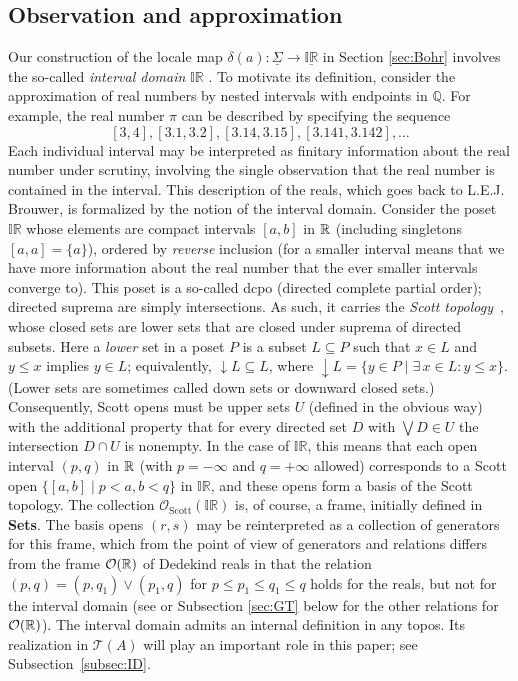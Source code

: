 \documentclass[12pt]{article}
\newcommand{\Q}{\mathbb{Q}}
\newcommand{\uIR}{\underline{\mathbb{IR}}}
\newcommand{\Sets}{\mbox{\textbf{Sets}}}
\newcommand{\raw}{\rightarrow} \newcommand{\rat}{\mapsto}
\newcommand{\dl}{\delta} \newcommand{\Dl}{\Delta}
\newcommand{\CO}{{\mathcal O}} \newcommand{\CP}{{\mathcal P}}
\newcommand{\alg}[1]{\ensuremath{#1}}
\newcommand{\functor}[1]{\ensuremath{\underline{#1}}}
\newcommand{\asstopos}{\ensuremath{\mathcal{T}}}
\newcommand{\TA}{\mathcal{T}(A)}
\newcommand{\ulS}{\functor{\Sigma}}
\renewcommand{\TA}{\asstopos(\alg{A})}
\begin{document}
\subsection{Observation and approximation}\label{subsec:AO}
Our construction of the locale map $\dl(a): \ulS\raw
\uIR$ in Section \ref{sec:Bohr} involves the so-called {\it interval domain}
$\mathbb{IR}$
\cite{scott:interval-domain}.
To motivate its definition, consider  the
approximation of real numbers by nested intervals with endpoints in $\Q$. For
example, the real number $\pi$ can be described by
specifying the sequence
\[
  [3,4],[3.1,3.2],[3.14,3.15],[3.141,3.142],\ldots
\]
Each individual interval may be interpreted as finitary information
about the real number under scrutiny, involving the single observation that the
real
number is contained in the interval. This description of the reals, which goes
back to L.E.J. Brouwer,
 is formalized by the notion of the interval domain. Consider the
 poset  $\mathbb{IR}$ whose  elements are compact intervals $[a,b]$ in ${\mathbb R}$  (including
singletons $[a,a]=\{a\}$),
  ordered by {\it reverse} inclusion (for a smaller interval means that we have
more information about the real number that the ever smaller intervals converge
to). This poset is a so-called dcpo (directed complete partial order); directed
suprema are simply intersections. As such, it carries the
{\it  Scott topology}~\cite{abramskyjung94,scott:interval-domain}, whose closed
sets are
lower sets that are closed under suprema of directed subsets. Here a {\it lower} set in a poset $P$
is a subset $L\subseteq P$ such that $x\in L$ and $y\leqslant x$ implies $y\in L$; equivalently,
$\downarrow\! L\subseteq L$, where $\downarrow\! L=\{y\in P\mid \exists\, x\in L: y\leqslant x\}$. (Lower sets are sometimes called down sets or downward closed sets.)
Consequently,
Scott opens must be upper sets $U$ (defined in the obvious way) with the additional property that  for every
directed set $D$ with $\bigvee D \in U$ the intersection $D\cap U$ is nonempty.
In the case of $\mathbb{IR}$, this means that
each open interval  $(p,q)$ in ${\mathbb R}$ (with $p=-\infty$ and $q=+\infty$ allowed)
corresponds to a Scott open $\{[a,b]\mid p<a, b<q\}$ in  $\mathbb{IR}$, and
these opens form a basis of  the Scott topology. The collection
$\CO_{\mathrm{Scott}}(\mathbb{IR})$ is, of course, a frame, initially defined in
\Sets. The basis opens $(r,s)$ may be reinterpreted as a collection of 
generators for this frame, which from the point of view of generators and relations differs from the frame
$\CO(\R)$ of Dedekind reals in that  the relation $(p,q)=(p,q_1)\vee (p_1,q)$ for $p\leqslant p_1\leqslant q_1\leqslant q$
holds for the reals, but not for the interval domain (see \cite[D4.7.4]{johnstone02b} or Subsection \ref{sec:GT} below
for the other relations for $\CO(\R)$). 
The interval domain admits an internal definition in any topos. Its
realization in $\TA$ will play an important role in this paper; see
Subsection~\ref{subsec:ID}.
\end{document}
